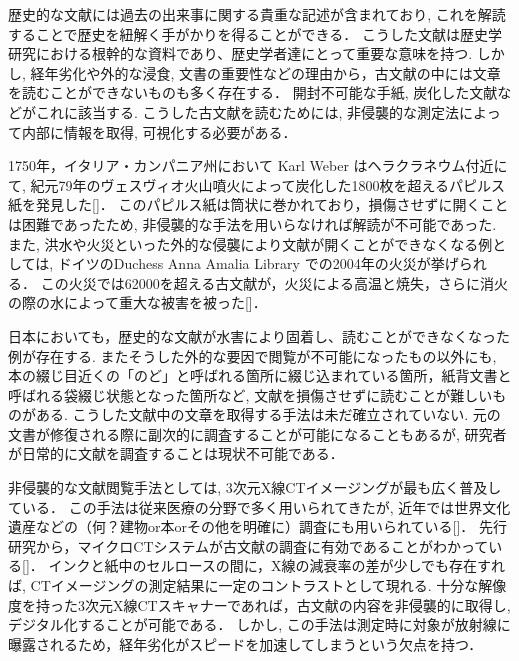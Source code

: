 
歴史的な文献には過去の出来事に関する貴重な記述が含まれており, これを解読することで歴史を紐解く手がかりを得ることができる．
こうした文献は歴史学研究における根幹的な資料であり、歴史学者達にとって重要な意味を持つ.
しかし, 経年劣化や外的な浸食, 文書の重要性などの理由から，古文献の中には文章を読むことができないものも多く存在する．
開封不可能な手紙, 炭化した文献などがこれに該当する.
こうした古文献を読むためには, 非侵襲的な測定法によって内部に情報を取得, 可視化する必要がある．

1750年，イタリア・カンパニア州において Karl Weber はヘラクラネウム付近にて, 紀元79年のヴェスヴィオ火山噴火によって炭化した1800枚を超えるパピルス紙を発見した[]．
このパピルス紙は筒状に巻かれており，損傷させずに開くことは困難であったため, 非侵襲的な手法を用いらなければ解読が不可能であった.
また, 洪水や火災といった外的な侵襲により文献が開くことができなくなる例としては, ドイツのDuchess Anna Amalia Library での2004年の火災が挙げられる．
この火災では62000を超える古文献が，火災による高温と焼失，さらに消火の際の水によって重大な被害を被った[]．

日本においても，歴史的な文献が水害により固着し、読むことができなくなった例が存在する.
またそうした外的な要因で閲覧が不可能になったもの以外にも, 本の綴じ目近くの「のど」と呼ばれる箇所に綴じ込まれている箇所，紙背文書と呼ばれる袋綴じ状態となった箇所など, 文献を損傷させずに読むことが難しいものがある.
こうした文献中の文章を取得する手法は未だ確立されていない.
元の文書が修復される際に副次的に調査することが可能になることもあるが, 研究者が日常的に文献を調査することは現状不可能である．

非侵襲的な文献閲覧手法としては, 3次元X線CTイメージングが最も広く普及している．
この手法は従来医療の分野で多く用いられてきたが, 近年では世界文化遺産などの（何？建物or本orその他を明確に）調査にも用いられている[]．
先行研究から，マイクロCTシステムが古文献の調査に有効であることがわかっている[]．
インクと紙中のセルロースの間に，X線の減衰率の差が少しでも存在すれば, CTイメージングの測定結果に一定のコントラストとして現れる.
十分な解像度を持った3次元X線CTスキャナーであれば，古文献の内容を非侵襲的に取得し, デジタル化することが可能である．
しかし, この手法は測定時に対象が放射線に曝露されるため，経年劣化がスピードを加速してしまうという欠点を持つ．

